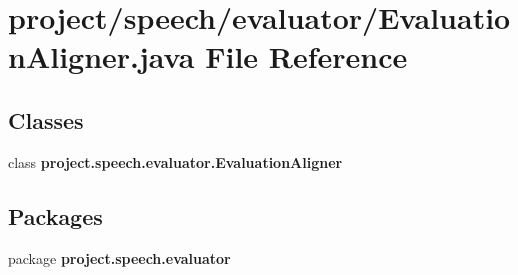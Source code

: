 \section{project/speech/evaluator/\+Evaluation\+Aligner.java File Reference}
\label{_evaluation_aligner_8java}
\subsection*{Classes}
\begin{DoxyCompactItemize}
\item 
class {\bf project.\+speech.\+evaluator.\+Evaluation\+Aligner}
\end{DoxyCompactItemize}
\subsection*{Packages}
\begin{DoxyCompactItemize}
\item 
package {\bf project.\+speech.\+evaluator}
\end{DoxyCompactItemize}
